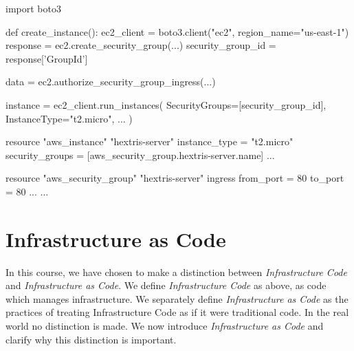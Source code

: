 \begin{code}[language=python]{}
import boto3

def create_instance():
    ec2_client = boto3.client("ec2", region_name="us-east-1")
    response = ec2.create_security_group(...)
    security_group_id = response['GroupId']

    data = ec2.authorize_security_group_ingress(...)

    instance = ec2_client.run_instances(
        SecurityGroups=[security_group_id],
        InstanceType="t2.micro",
        ...
    )
\end{code}

\begin{code}[language=terraform]{}
resource "aws_instance" "hextris-server" {
    instance_type = "t2.micro"
    security_groups = [aws_security_group.hextris-server.name]
    ...
}

resource "aws_security_group" "hextris-server" {
    ingress {
        from_port = 80
        to_port = 80
        ...
    }
    ...
}
\end{code}


%  
%  


\section{Infrastructure as Code}

In this course, we have chosen to make a distinction between \textsl{Infrastructure Code} and \textsl{Infrastructure as Code}.
We define \textsl{Infrastructure Code} as above,
as code which manages infrastructure.
We separately define \textsl{Infrastructure as Code} as the practices of treating Infrastructure Code as if it were traditional code.
In the real world no distinction is made.
We now introduce \textsl{Infrastructure as Code} and clarify why this distinction is important.

